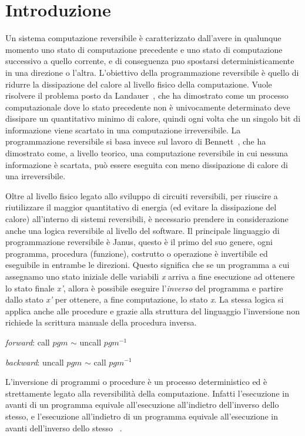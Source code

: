 \documentclass{article}
\theoremstyle{plain}
\theoremstyle{definition}
\theoremstyle{plain}
\begin{document}
\restoregeometry


\section{Introduzione}\label{intro}

Un sistema computazione reversibile è caratterizzato dall'avere in qualunque momento uno stato di computazione precedente e uno stato di computazione successivo a quello corrente, e di conseguenza puo spostarsi deterministicamente in una direzione o l'altra. L'obiettivo della programmazione reversibile è quello di ridurre la dissipazione del calore al livello fisico della computazione. Vuole risolvere il problema posto da Landauer~\cite{landauerIrreversibilityHeatGeneration1961}, che ha dimostrato come un processo computazionale dove lo stato precedente non è univocamente determinato deve dissipare un quantitativo minimo di calore, quindi ogni volta che un singolo bit di informazione viene scartato in una computazione irreversibile. La programmazione reversibile si basa invece sul lavoro di Bennett~\cite{Bennett}, che ha dimostrato come, a livello teorico, una computazione reversibile in cui nessuna informazione è scartata, può essere eseguita con meno dissipazione di calore di una irreversibile.
\medskip

Oltre al livello fisico legato allo sviluppo di circuiti reversibili, per riuscire a riutilizzare il maggior quantitativo di energia (ed evitare la dissipazione del calore) all'interno di sistemi reversibili, è necessario prendere in considerazione anche una logica reversibile al livello del software. Il principale linguaggio di programmazione reversibile è Janus, questo è il primo del suo genere, ogni programma, procedura (funzione), costrutto o operazione è invertibile ed eseguibile in entrambe le direzioni. Questo significa che se un programma a cui assegnamo uno stato iniziale delle variabili \emph{x} arriva a fine esecuzione ad ottenere lo stato finale \emph{x'}, allora è possibile eseguire l'\emph{inverso} del programma e partire dallo stato \emph{x'} per ottenere, a fine computazione, lo stato \emph{x}. La stessa logica si applica anche alle procedure e grazie alla struttura del linguaggio l'inversione non richiede la scrittura manuale della procedura inversa.
\centerline{\emph{forward}: call $pgm$ $\sim$ uncall $pgm^{-1}$}
\centerline{\emph{backward}: uncall $pgm$ $\sim$ call $pgm^{-1}$}
L'inversione di programmi o procedure è un processo deterministico ed è strettamente legato alla reversibilità della computazione. Infatti l'esecuzione in avanti di un programma equivale all'esecuzione all'indietro dell'inverso dello stesso, e l'esecuzione all'indietro di un programma equivale all'esecuzione in avanti dell'inverso dello stesso ~\cite{JanusSem}.
\medskip
\end{document}
